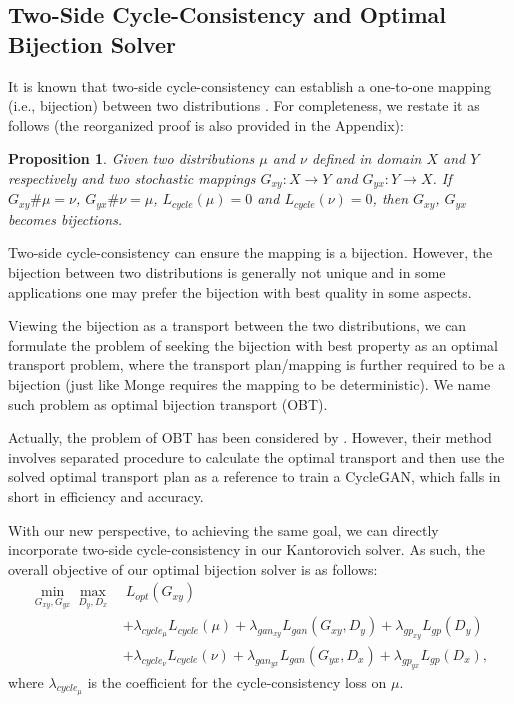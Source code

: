 \documentclass[runningheads]{llncs}
\newtheorem{prop}{Proposition}
\begin{document}
\subsection{Two-Side Cycle-Consistency and Optimal Bijection Solver}
\label{discussion two-side cycle-consistency}

It is known that two-side cycle-consistency can establish a one-to-one mapping (i.e., bijection) between two distributions \cite{cyclegan}. For completeness, we restate it as follows (the reorganized proof is also provided in the Appendix): 
\begin{prop}
	\label{two-side cycle-consistency}
	Given two distributions $\mu$ and $\nu$ defined in domain $X$ and $Y$ respectively and two stochastic mappings $G_{xy}: X \rightarrow Y$ and $G_{yx}: Y \rightarrow X$. If $G_{xy}\#\mu = \nu$, $G_{yx}\#\nu = \mu$, $L_{cycle}(\mu)=0$ and $L_{cycle}(\nu)=0$, then $G_{xy}$, $G_{yx}$ becomes bijections. 
\end{prop}

Two-side cycle-consistency can ensure the mapping is a bijection. However, the bijection between two distributions is generally not unique and in some applications one may prefer the bijection with best quality in some aspects.

Viewing the bijection as a transport between the two distributions, we can formulate the problem of seeking the bijection with best property as an optimal transport problem, where the transport plan/mapping is further required to be a bijection (just like Monge requires the mapping to be deterministic). We name such problem as optimal bijection transport (OBT). 

Actually, the problem of OBT has been considered by \cite{ot-cyclegan}. However, their method involves separated procedure to calculate the optimal transport and then use the solved optimal transport plan as a reference to train a CycleGAN, which falls in short in efficiency and accuracy. 

With our new perspective, to achieving the same goal, we can directly incorporate two-side cycle-consistency in our Kantorovich solver. As such, the overall objective of our optimal bijection solver is as follows: 
\begin{equation}
\begin{aligned}
\min\limits_{G_{xy},G_{yx}} \max\limits_{D_{y},D_{x}} 
& \ L_{opt}(G_{xy}) \\
& + \lambda_{cycle_{\mu}} L_{cycle}(\mu) + \lambda_{gan_{xy}} L_{gan}(G_{xy}, D_{y}) + \lambda_{gp_{xy}} L_{gp}(D_{y}) \\
& + \lambda_{cycle_{\nu}} L_{cycle}(\nu) + \lambda_{gan_{yx}} L_{gan}(G_{yx}, D_{x}) + \lambda_{gp_{yx}} L_{gp}(D_{x}),
\end{aligned}
\end{equation}
where $\lambda_{cycle_{\mu}}$ is the coefficient for the cycle-consistency loss on $\mu$. 
\end{document}
